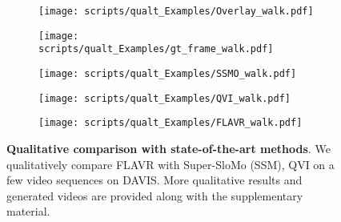 \documentclass[10pt,twocolumn,letterpaper]{article}
\newcommand{\red}[1]{{#1}}
\newcommand{\Ours}{FLAVR}
\begin{document}
\begin{figure}[t]
\begin{center}
    \begin{subfigure}[b]{0.09\textwidth}
        \centering
        \texttt{[image: scripts/qualt\_Examples/Overlay\_walk.pdf]}
        \captionsetup{width=\textwidth}
    \end{subfigure}
    \hfill
    \begin{subfigure}[b]{0.09\textwidth}
        \centering
        \texttt{[image: scripts/qualt\_Examples/gt\_frame\_walk.pdf]}
        \captionsetup{width=\textwidth}
    \end{subfigure}
    \hfill
    \begin{subfigure}[b]{0.09\textwidth}
        \centering
        \texttt{[image: scripts/qualt\_Examples/SSMO\_walk.pdf]}
    \end{subfigure}
    \hfill
    \begin{subfigure}[b]{0.09\textwidth}
        \centering
        \texttt{[image: scripts/qualt\_Examples/QVI\_walk.pdf]}
        \captionsetup{width=\textwidth}
    \end{subfigure}
    \hfill
    \begin{subfigure}[b]{0.09\textwidth}
        \centering
        \texttt{[image: scripts/qualt\_Examples/FLAVR\_walk.pdf]}
        \captionsetup{width=\textwidth}
        \subcaption{\Ours{}}
    \end{subfigure}
    \end{center}
\caption{{\bf Qualitative comparison with state-of-the-art methods}. We qualitatively compare FLAVR with Super-SloMo (SSM), QVI on a few video sequences on DAVIS. More qualitative results and generated videos are provided along with the \red{supplementary} material.}
    \label{fig:qualt_figs}
    \vspace{-12pt}
\end{figure} \begin{table*}[!t]\begin{subtable}[b]{.35\textwidth} \centering



\end{subtable}
\end{table*}
\end{document}
